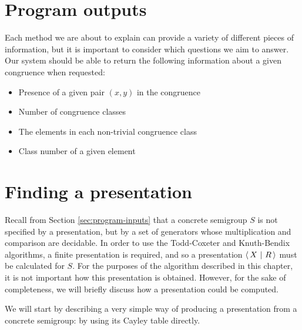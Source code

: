 \section{Program outputs}
\label{sec:program-outputs}

Each method we are about to explain can provide a variety of different pieces of
information, but it is important to consider which questions we aim to answer.
Our system should be able to return the following information about a given
congruence when requested:

\begin{itemize}
\item Presence of a given pair $(x,y)$ in the congruence
\item Number of congruence classes
\item The elements in each non-trivial congruence class
\item Class number of a given element
\end{itemize}

\section{Finding a presentation}
\label{sec:find-pres}

Recall from Section \ref{sec:program-inputs} that a concrete semigroup $S$ is
not specified by a presentation, but by a set of generators whose multiplication
and comparison are decidable.  In order to use the Todd-Coxeter and
Knuth-Bendix algorithms, a finite presentation is required, and so a presentation
$\left\langle\,X ~\middle|~ R\,\right\rangle$ must be calculated for $S$.  For the purposes of the algorithm
described in this chapter, it is not important how this presentation is
obtained.  However, for the sake of completeness, we will briefly discuss how a
presentation could be computed.

We will start by describing a very simple way of producing a presentation from a
concrete semigroup: by using its Cayley table directly.

